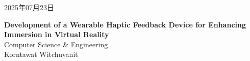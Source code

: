 \documentclass[uplatex,
12pt, %
a4paper,
english, %
oneside,
titlepage,
singlespacing, %
liststotoc, %
headsepline,
]{MastersDoctoralThesis} %
\begin{document}
\vspace{2cm} %
\begin{center}
  \begin{CJK*}{UTF8}{min}
      {2025年07月23日} %
      {}
		\end{CJK*}
\end{center}


		
		
		


\clearpage
\thispagestyle{empty}
\begin{center}
    \vspace*{1cm} %

    {\Large \textbf{Development of a Wearable Haptic Feedback Device for Enhancing Immersion in Virtual Reality}} \\ %
    \vspace{1.5cm} %
    {Computer Science \& Engineering} \\ %
    {Korntawat Witchuvanit} \\ %

    \vspace*{2cm} %
\end{center}
\end{document}
